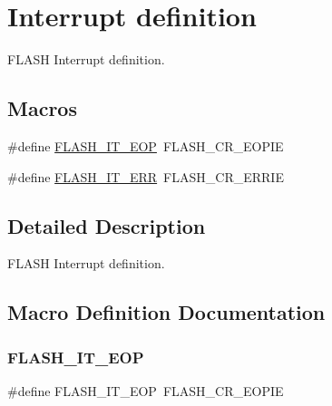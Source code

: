 \hypertarget{group___f_l_a_s_h___interrupt__definition}{}\section{Interrupt definition}
\label{group___f_l_a_s_h___interrupt__definition}


F\+L\+A\+SH Interrupt definition.  


\subsection*{Macros}
\begin{DoxyCompactItemize}
\item 
\#define \hyperlink{group___f_l_a_s_h___interrupt__definition_gaea20e80e1806d58a7544cfe8659e7f11}{F\+L\+A\+S\+H\+\_\+\+I\+T\+\_\+\+E\+OP}~F\+L\+A\+S\+H\+\_\+\+C\+R\+\_\+\+E\+O\+P\+IE
\item 
\#define \hyperlink{group___f_l_a_s_h___interrupt__definition_ga4e2c23ab8c1b9a5ee49bf6d695d9ae8c}{F\+L\+A\+S\+H\+\_\+\+I\+T\+\_\+\+E\+RR}~F\+L\+A\+S\+H\+\_\+\+C\+R\+\_\+\+E\+R\+R\+IE
\end{DoxyCompactItemize}


\subsection{Detailed Description}
F\+L\+A\+SH Interrupt definition. 



\subsection{Macro Definition Documentation}
\mbox{\label{group___f_l_a_s_h___interrupt__definition_gaea20e80e1806d58a7544cfe8659e7f11}} 
\subsubsection{\texorpdfstring{F\+L\+A\+S\+H\+\_\+\+I\+T\+\_\+\+E\+OP}{FLASH\_IT\_EOP}}
{\footnotesize\ttfamily \#define F\+L\+A\+S\+H\+\_\+\+I\+T\+\_\+\+E\+OP~F\+L\+A\+S\+H\+\_\+\+C\+R\+\_\+\+E\+O\+P\+IE}

